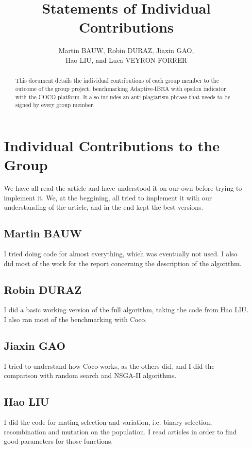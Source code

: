 \documentclass{article}
\begin{document}
\title{Statements of Individual Contributions}

\author{Martin BAUW, Robin DURAZ, Jiaxin GAO,\\ Hao LIU, and Luca VEYRON-FORRER}
\maketitle
\begin{abstract}
This document details the individual contributions of each group member to the outcome of the group project, benchmarking Adaptive-IBEA with epsilon indicator with the COCO platform. It also includes an anti-plagiarism phrase that needs to be signed by every group member.
\end{abstract}


\section{Individual Contributions to the Group}
We have all read the article and have understood it on our own before trying to
implement it. We, at the beggining, all tried to implement it with our
understanding of the article, and in the end kept the best versions.

\subsection{Martin BAUW}
I tried doing code for almost everything, which was eventually not used. I also
did most of the work for the report concerning the description of the algorithm.

\subsection{Robin DURAZ}
I did a basic working version of the full algorithm, taking the code from Hao
LIU. I also ran most of the benchmarking with Coco.

\subsection{Jiaxin GAO}
I tried to understand how Coco works, as the others did, and I did the
comparison with random search and NSGA-II algorithms. 

\subsection{Hao LIU}
I did the code for mating selection and variation, i.e. binary selection,
recombination and mutation on the population. I read articles in order to find
good parameters for those functions.
\end{document}
